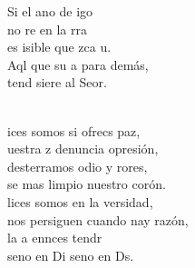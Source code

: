 \documentclass[12pt]{article}
\begin{document}
\begin{multicols*}{2}
\begin{cancion}[Bienaventuranzas][Kairoi]
	\begin{chorus}%
	Si el ano de igo \\
	no re en la rra\\
	es isible que zca u.\\
	Aql que  su a para  demás,\\
	tend siere al Seor.\\
	\end{chorus}%
	\jump\\
	ices somos si ofrecs paz,\\
	uestra z denuncia  opresión,\\
	desterramos odio y rores,\\
	se mas limpio nuestro corón.\\
	lices somos en la versidad,\\
	nos persiguen cuando nay razón,\\
	la a ennces tendr\\
	seno en Di seno en Ds.\\
\end{cancion}%


\end{multicols*}
\end{document}
